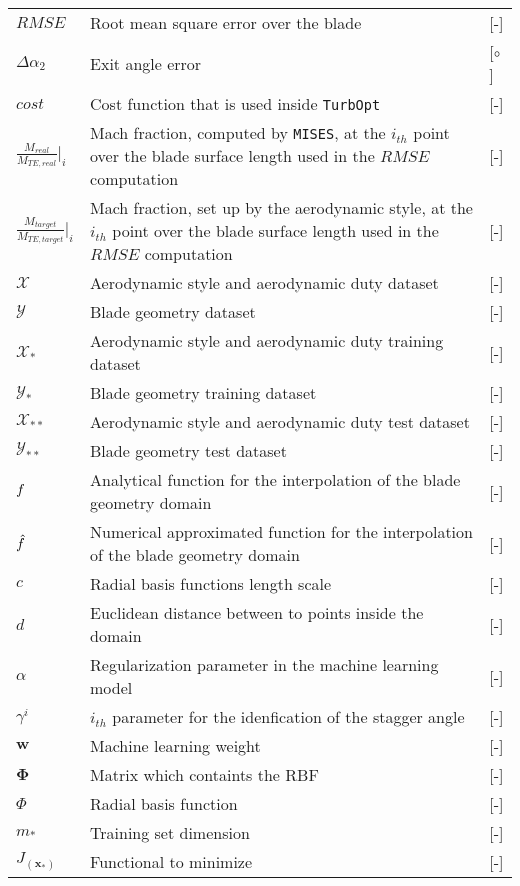 \documentclass{config/polimiThesis}
\begin{document}
\begin{longtable}{p{2.5cm}p{8cm}p{2.5cm}}
    $RMSE$ & Root mean square error over the blade & [-] \\
    $\Delta \alpha_2$ & Exit angle error & [$\circ$] \\ 
    $cost$ & Cost function that is used inside \texttt{TurbOpt} & [-] \\ 
    $\frac{M_{real}}{M_{TE,real}} \Big|_i$ & Mach fraction, computed by \texttt{MISES}, at the $i_{th}$ point over the blade surface length used in the $RMSE$ computation & [-] \\
    $\frac{M_{target}}{M_{TE,target}} \Big|_i$ & Mach fraction, set up by the aerodynamic style, at the $i_{th}$ point over the blade surface length used in the $RMSE$ computation & [-] \\
    $\mathcal{X}$ & Aerodynamic style and aerodynamic duty dataset & [-] \\
    $\mathcal{Y}$ & Blade geometry dataset & [-] \\
    $\mathcal{X_{*}}$ & Aerodynamic style and aerodynamic duty training dataset & [-] \\
    $\mathcal{Y_{*}}$ & Blade geometry training dataset & [-] \\
    $\mathcal{X_{**}}$ & Aerodynamic style and aerodynamic duty test dataset & [-] \\
    $\mathcal{Y_{**}}$ & Blade geometry test dataset & [-] \\ 
    $\mathnormal{f}$ & Analytical function for the interpolation of the blade geometry domain & [-] \\
    $\hat{\mathnormal{f}}$ & Numerical approximated function for the interpolation of the blade geometry domain & [-] \\
    $c$ & Radial basis functions length scale & [-] \\ 
    $d$ & Euclidean distance between to points inside the domain & [-] \\
    $\alpha$ & Regularization parameter in the machine learning model & [-] \\ 
    $\gamma^{i}$ & $i_{th}$ parameter for the idenfication of the stagger angle & [-] \\ 
    $\boldsymbol{w}$ & Machine learning weight & [-] \\ 
    $\boldsymbol{\Phi}$ & Matrix which containts the RBF & [-] \\ 
    $\Phi$ & Radial basis function & [-] \\ 
    $m_*$ & Training set dimension & [-] \\ 
    $J_{(\boldsymbol{x}_*)}$ & Functional to minimize & [-] \\ 

\end{longtable}
\end{document}
